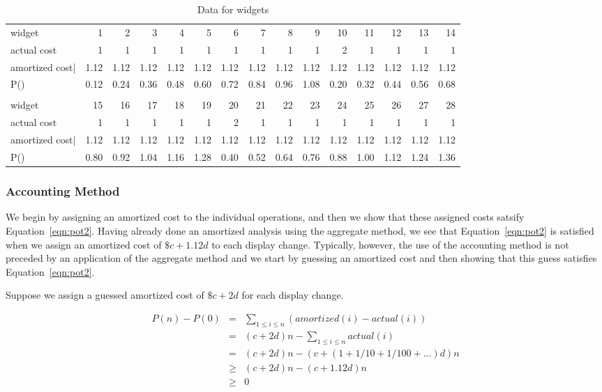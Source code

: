 \begin{table}
\begin{tabular}{|l| r r r r r r r r r r r r r r|}\\
widget&1&2&3&4&5&6&7&8&9&10&11&12&13&14\\
actual cost&1&1&1&1&1&1&1&1&1&2&1&1&1&1\\
amortized cost|&1.12&1.12&1.12&1.12&1.12&1.12&1.12&1.12&1.12&1.12&1.12&1.12&1.12&1.12\\
P()&0.12&0.24&0.36&0.48&0.60&0.72&0.84&0.96&1.08&0.20&0.32&0.44&0.56&0.68\\\hline\hline\\
widget&15&16&17&18&19&20&21&22&23&24&25&26&27&28\\
actual cost&1&1&1&1&1&2&1&1&1&1&1&1&1&1\\
amortized cost|&1.12&1.12&1.12&1.12&1.12&1.12&1.12&1.12&1.12&1.12&1.12&1.12&1.12&1.12\\
P()&0.80&0.92&1.04&1.16&1.28&0.40&0.52&0.64&0.76&0.88&1.00&1.12&1.24&1.36\\
\end{tabular}
\caption{Data for widgets\label{table:widget}}
\end{table}


\subsubsection*{Accounting Method}
We begin by assigning an amortized cost to the individual operations,
and then we show that these assigned costs satsify Equation~\ref{eqn:pot2}.
Having already done an amortized analysis using the aggregate method, we
see that Equation~\ref{eqn:pot2} is satisfied when we assign an amortized cost of
$\$c + 1.12d$ to each display change.
Typically, however, the use of the accounting method is not preceded
by an application of the aggregate method and we start by guessing
an amortized cost and then showing that this guess satisfies
Equation~\ref{eqn:pot2}.

Suppose we assign a guessed amortized cost of 
$\$c + 2d$ for each display change.

\begin{eqnarray*}
P(n) - P(0) &=& \sum_{1 \leq  i \leq  n} (amortized(i) - actual(i))\\
&=& (c + 2d)n - \sum_{1 \leq i \leq n}actual(i)\\
&=& (c + 2d)n - (c + (1 + 1/10 + 1/100 + ...)d)n\\
&\geq& (c + 2d)n - (c + 1.12d)n\\
&\geq& 0
\end{eqnarray*}

